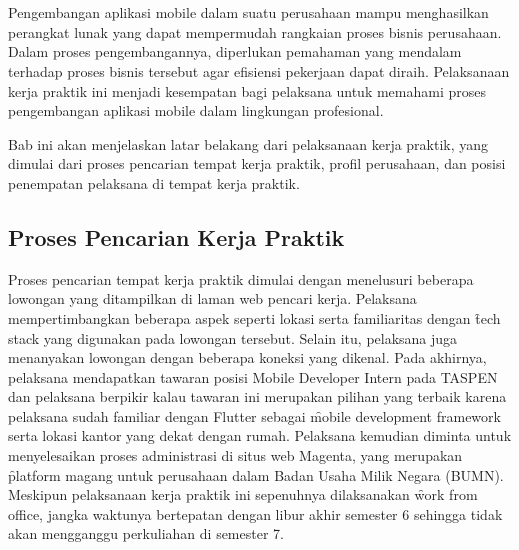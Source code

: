 \chapter{\babSatu}
\label{bab:1}
Pengembangan aplikasi mobile dalam suatu perusahaan mampu menghasilkan perangkat
lunak yang dapat mempermudah rangkaian proses bisnis perusahaan. Dalam proses
pengembangannya, diperlukan pemahaman yang mendalam terhadap proses bisnis
tersebut agar efisiensi pekerjaan dapat diraih. Pelaksanaan kerja praktik ini
menjadi kesempatan bagi pelaksana untuk memahami proses pengembangan aplikasi
mobile dalam lingkungan profesional.

Bab ini akan menjelaskan latar belakang dari pelaksanaan kerja praktik, yang
dimulai dari proses pencarian tempat kerja praktik, profil perusahaan, dan
posisi penempatan pelaksana di tempat kerja praktik.



\section{Proses Pencarian Kerja Praktik}
\label{sec:prosesPencarian}

Proses pencarian tempat kerja praktik dimulai dengan menelusuri beberapa
lowongan yang ditampilkan di laman web pencari kerja. Pelaksana mempertimbangkan
beberapa aspek seperti lokasi serta familiaritas dengan \f{tech stack} yang
digunakan pada lowongan tersebut. Selain itu, pelaksana juga menanyakan lowongan
dengan beberapa koneksi yang dikenal. Pada akhirnya, pelaksana mendapatkan
tawaran posisi Mobile Developer Intern pada TASPEN dan pelaksana berpikir kalau
tawaran ini merupakan pilihan yang terbaik karena pelaksana sudah familiar
dengan Flutter sebagai \f{mobile development framework} serta lokasi kantor yang
dekat dengan rumah. Pelaksana kemudian diminta untuk menyelesaikan proses
administrasi di situs web Magenta, yang merupakan \f{platform} magang untuk
perusahaan dalam Badan Usaha Milik Negara (BUMN). Meskipun pelaksanaan kerja
praktik ini sepenuhnya dilaksanakan \f{work from office}, jangka waktunya bertepatan
dengan libur akhir semester 6 sehingga tidak akan mengganggu perkuliahan di
semester 7.



